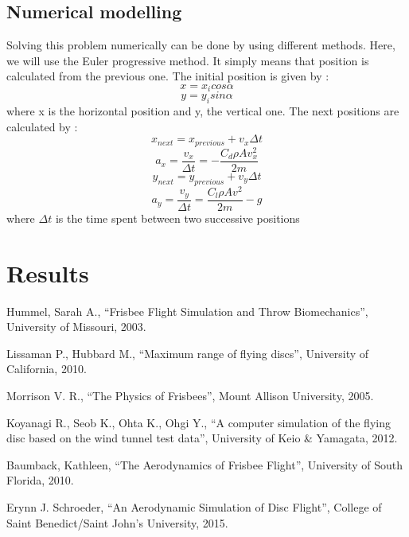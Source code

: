 \documentclass[10pt,a4paper]{report}
\begin{document}
\subsection{Numerical modelling}
Solving this problem numerically can be done by using different methods. Here, we will use the Euler progressive method. It simply means that position is calculated from the previous one.
The initial position is given by :
\[x = x_i cos\alpha\]
\[y = y_i sin\alpha\]
where x is the horizontal position and y, the vertical one.
The next positions are calculated by :
\[x_{next} = x_{previous} + v_x \Delta t \]
\[a_x=\frac{v_x}{\Delta t} = -\frac{C_d \rho A  v_x^2}{2m}\]
\[y_{next} = y_{previous} + v_y \Delta t \]
\[a_y = \frac{v_y}{\Delta t} = \frac{C_l \rho A  v^2}{2m} - g\]
where $\Delta t$ is the time spent between two successive positions
\section{Results}

\begin{thebibliography}{9}

  Hummel, Sarah A.,
  “Frisbee Flight Simulation and Throw Biomechanics”,
  University of Missouri,
  2003.
  
  Lissaman P., Hubbard M.,
  “Maximum range of flying discs”,
  University of California,
  2010.
  
  Morrison V. R.,
  “The Physics of Frisbees”,
  Mount Allison University,
  2005.

  Koyanagi R., Seob K., Ohta K., Ohgi Y.,
  “A computer simulation of the flying disc based on the wind tunnel test data”,
  University of Keio \& Yamagata,
  2012.
  
  Baumback, Kathleen,
  “The Aerodynamics of Frisbee Flight”,
  University of South Florida,
  2010.
  
  Erynn J. Schroeder,
  “An Aerodynamic Simulation of Disc Flight”,
  College of Saint Benedict/Saint John's University,
  2015.

\end{thebibliography}
\end{document}
